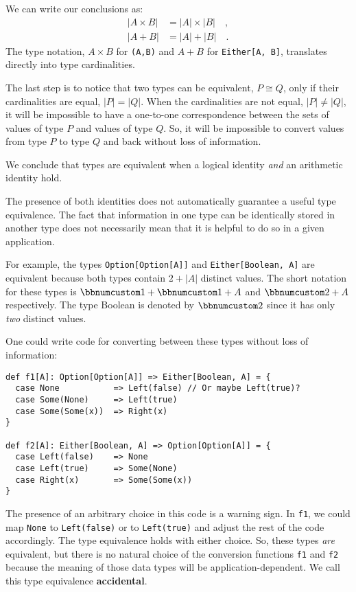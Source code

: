 We can write our conclusions as:
\begin{align*}
\left|A\times B\right| & =\left|A\right|\times\left|B\right|\quad,\\
\left|A+B\right| & =\left|A\right|+\left|B\right|\quad.
\end{align*}
The type notation, $A\times B$ for \lstinline!(A,B)! and $A+B$
for \lstinline!Either[A, B]!, translates directly into type cardinalities.

The last step is to notice that two types can be equivalent, $P\cong Q$,
only if their cardinalities are equal, $\left|P\right|=\left|Q\right|$.
When the cardinalities are not equal, $\left|P\right|\neq\left|Q\right|$,
it will be impossible to have a one-to-one correspondence between
the sets of values of type $P$ and values of type $Q$. So, it will
be impossible to convert values from type $P$ to type $Q$ and back
without loss of information.

We conclude that types are equivalent when a logical identity \emph{and}
an arithmetic identity hold.

The presence of both identities does not automatically guarantee a
useful type equivalence. The fact that information in one type can
be identically stored in another type does not necessarily mean that
it is helpful to do so in a given application.

For example, the types \lstinline!Option[Option[A]]! and \lstinline!Either[Boolean, A]!
are equivalent because both types contain $2+\left|A\right|$ distinct
values. The short notation for these types is $\bbnum 1+\bbnum 1+A$
and $\bbnum 2+A$ respectively. The type Boolean is denoted by $\bbnum 2$
since it has only \emph{two} distinct values. 

One could write code for converting between these types without loss
of information:
\begin{lstlisting}
def f1[A]: Option[Option[A]] => Either[Boolean, A] = {
  case None           => Left(false) // Or maybe Left(true)?
  case Some(None)     => Left(true)
  case Some(Some(x))  => Right(x)
}

def f2[A]: Either[Boolean, A] => Option[Option[A]] = {
  case Left(false)    => None
  case Left(true)     => Some(None)
  case Right(x)       => Some(Some(x))
}
\end{lstlisting}
The presence of an arbitrary choice in this code is a warning sign.
In \lstinline!f1!, we could map \lstinline!None! to \lstinline!Left(false)!
or to \lstinline!Left(true)! and adjust the rest of the code accordingly.
The type equivalence holds with either choice. So, these types \emph{are}
equivalent, but there is no natural choice of the conversion functions
\lstinline!f1! and \lstinline!f2! because the meaning of those data
types will be application-dependent. We call this type equivalence
\textbf{accidental}.

